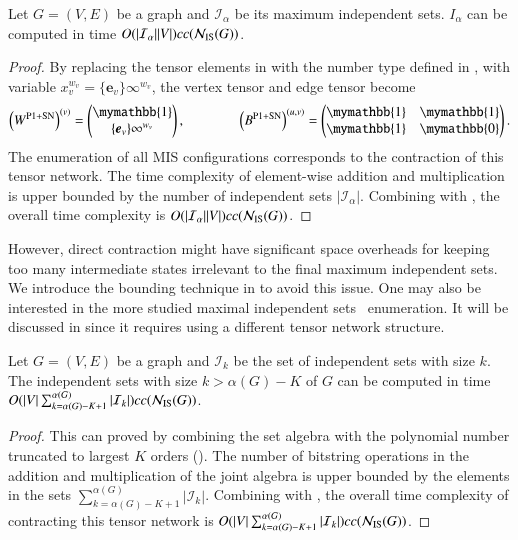 \documentclass[review, onefignum, onetabnum]{siamart190516}
\begin{document}
\begin{theorem}\label{thm:complexmis}
    Let $G = (V, E)$ be a graph and $\mathcal{I}_\alpha$ be its maximum independent sets.
    $I_\alpha$ can be computed in time $O(|\mathcal{I}_\alpha||V|)cc({\mathcal{N}_{\rm IS}(G)})$.
\end{theorem}
\begin{proof}
By replacing the tensor elements in  with the number type defined in , with variable $x_v^{w_v} = \{\boldsymbol{e}_{v}\}\infty^{w_v}$, the vertex tensor and edge tensor become
\begin{equation}
    \left(W^{\rm P1+SN}\right)^{(v)} = \left(\begin{matrix}
        \mymathbb{1} \\
        \{\boldsymbol{e}_{v}\}\infty^{w_v}
    \end{matrix}\right),   
    \qquad \qquad
        \left(B^{\rm P1+SN}\right)^{(u, v)} = \left(\begin{matrix}
        \mymathbb{1}  & \mymathbb{1} \\
        \mymathbb{1} & \mymathbb{0}
    \end{matrix}\right).
\end{equation}
The enumeration of all MIS configurations corresponds to the contraction of this tensor network. The time complexity of element-wise addition and multiplication is upper bounded by the number of independent sets $|\mathcal{I}_\alpha|$. Combining with , the overall time complexity is $O(|\mathcal{I}_\alpha||V|)cc({\mathcal{N}_{\rm IS}(G)})$.
\end{proof}
However, direct contraction might have significant space overheads for keeping too many intermediate states irrelevant to the final maximum independent sets.
We introduce the bounding technique in  to avoid this issue.
One may also be interested in the more studied maximal independent sets~\cite{Bron1973, Eppstein2010, Johnson1988} enumeration.
It will be discussed in  since it requires using a different tensor network structure.

\begin{theorem}\label{thm:complexsetk}
    Let $G = (V, E)$ be a graph and $\mathcal{I}_k$ be the set of independent sets with size $k$.
    The independent sets with size $k > \alpha(G)-K$ of $G$ can be computed in time $O(|V|\sum_{k=\alpha(G)-K+1}^{\alpha(G)}|\mathcal{I}_k|)cc({\mathcal{N}_{\rm IS}(G)})$.
\end{theorem}
\begin{proof}
This can proved by combining the set algebra  with the polynomial number truncated to largest $K$ orders ().
The number of bitstring operations in the addition and multiplication of the joint algebra is upper bounded by the elements in the sets $\sum_{k=\alpha(G)-K+1}^{\alpha(G)}|\mathcal{I}_k|$.
Combining with , the overall time complexity of contracting this tensor network is $O(|V|\sum_{k=\alpha(G)-K+1}^{\alpha(G)}|\mathcal{I}_k|)cc({\mathcal{N}_{\rm IS}(G)})$.
\end{proof}
\end{document}
